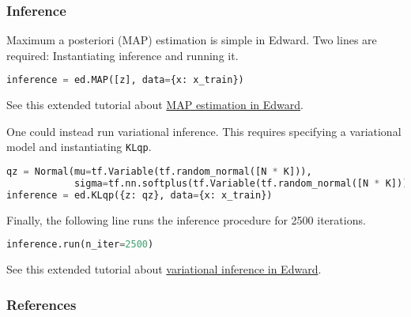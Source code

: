 \subsubsection{Inference}

Maximum a posteriori (MAP) estimation is simple in Edward. Two lines are
required: Instantiating inference and running it.
\begin{lstlisting}[language=Python]
inference = ed.MAP([z], data={x: x_train})
\end{lstlisting}

See this extended tutorial about
\href{/tutorials/map}{MAP estimation in Edward}.

One could instead run variational inference. This requires specifying
a variational model and instantiating \texttt{KLqp}.
\begin{lstlisting}[language=Python]
qz = Normal(mu=tf.Variable(tf.random_normal([N * K])),
            sigma=tf.nn.softplus(tf.Variable(tf.random_normal([N * K]))))
inference = ed.KLqp({z: qz}, data={x: x_train})
\end{lstlisting}
Finally, the following line runs the inference procedure for 2500
iterations.
\begin{lstlisting}[language=Python]
inference.run(n_iter=2500)
\end{lstlisting}
See this extended tutorial about
\href{/tutorials/variational-inference}{variational inference in Edward}.

\subsubsection{References}

